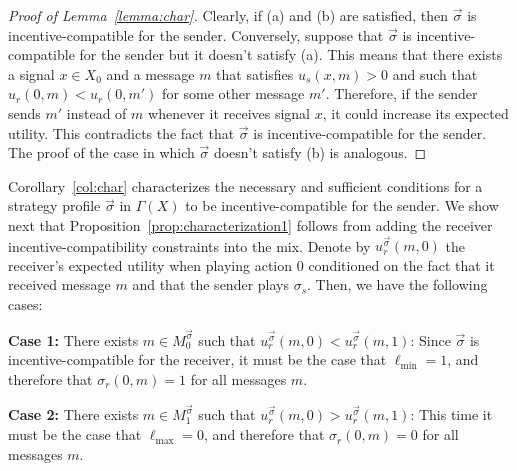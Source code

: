 \documentclass[submission,copyright,creativecommons]{eptcs}
\begin{document}
\begin{proof}[Proof of Lemma~\ref{lemma:char}]
Clearly, if (a) and (b) are satisfied, then $\vec{\sigma}$ is incentive-compatible for the sender. Conversely, suppose that $\vec{\sigma}$ is incentive-compatible for the sender but it doesn't satisfy (a). This means that there exists a signal $x \in X_0$ and a message $m$ that satisfies $u_s(x, m) > 0$ and such that $u_r(0, m) < u_r(0, m')$ for some other message $m'$. Therefore, if the sender sends $m'$ instead of $m$ whenever it receives signal $x$, it could increase its expected utility. This contradicts the fact that $\vec{\sigma}$ is incentive-compatible for the sender. The proof of the case in which $\vec{\sigma}$ doesn't satisfy (b) is analogous.
\end{proof}

Corollary~\ref{col:char} characterizes the necessary and sufficient conditions for a strategy profile $\vec{\sigma}$ in $\Gamma(X)$ to be incentive-compatible for the sender. We show next that Proposition~\ref{prop:characterization1} follows from adding the receiver incentive-compatibility constraints into the mix. Denote by $u_r^{\vec{\sigma}}(m, 0)$ the receiver's expected utility when playing action $0$ conditioned on the fact that it received message $m$ and that the sender plays $\sigma_s$. Then, we have the following cases:

\textbf{Case 1:} There exists $m \in M_0^{\vec{\sigma}}$ such that $u_r^{\vec{\sigma}}(m, 0) < u_r^{\vec{\sigma}}(m, 1)$: Since $\vec{\sigma}$ is incentive-compatible for the receiver, it must be the case that $\ell_{\min} = 1$, and therefore that $\sigma_r(0, m) = 1$ for all messages $m$.

\textbf{Case 2:} There exists $m \in M_1^{\vec{\sigma}}$ such that $u_r^{\vec{\sigma}}(m, 0) > u_r^{\vec{\sigma}}(m, 1)$: This time it must be the case that $\ell_{\max} = 0$, and therefore that $\sigma_r(0, m) = 0$ for all messages $m$.
\end{document}
